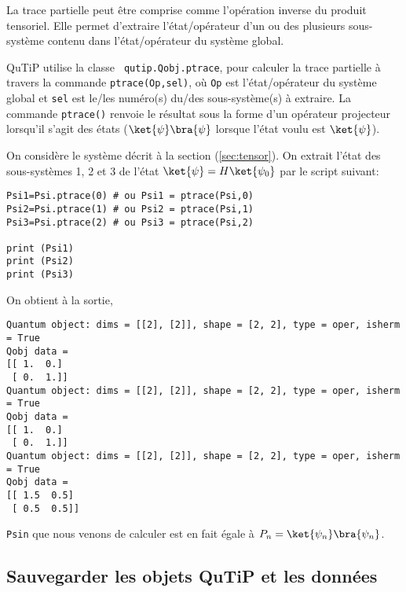 La trace partielle peut être comprise comme l'opération inverse du produit 
tensoriel. Elle permet d'extraire l'état/opérateur d'un ou des plusieurs 
sous-système contenu dans l'état/opérateur du système global.

QuTiP utilise la classe \texttt{ qutip.Qobj.ptrace}, pour calculer la trace 
partielle à travers la commande \texttt{ptrace(Op,sel)}, où \texttt{Op} est 
l'état/opérateur du système global et \texttt{sel} est le/les numéro(s) du/des 
sous-système(s) à extraire. La commande \texttt{ptrace()} renvoie le résultat 
sous la forme d'un opérateur projecteur lorsqu'il s'agit des états 
($\ket{\psi}\bra{\psi}$ lorsque l'état voulu est $\ket{\psi}$).

On considère le système décrit à la section (\ref{sec:tensor}). On extrait 
l'état des sous-systèmes 1, 2 et 3 de l'état $\ket{\psi}=H\ket{\psi_0}$ par le 
script suivant:\\
\begin{lstlisting}
Psi1=Psi.ptrace(0) # ou Psi1 = ptrace(Psi,0)
Psi2=Psi.ptrace(1) # ou Psi2 = ptrace(Psi,1)
Psi3=Psi.ptrace(2) # ou Psi3 = ptrace(Psi,2)

print (Psi1)
print (Psi2)
print (Psi3)
\end{lstlisting}
On obtient à la sortie,
\begin{lstlisting}
Quantum object: dims = [[2], [2]], shape = [2, 2], type = oper, isherm = True
Qobj data =
[[ 1.  0.]
 [ 0.  1.]]
Quantum object: dims = [[2], [2]], shape = [2, 2], type = oper, isherm = True
Qobj data =
[[ 1.  0.]
 [ 0.  1.]]
Quantum object: dims = [[2], [2]], shape = [2, 2], type = oper, isherm = True
Qobj data =
[[ 1.5  0.5]
 [ 0.5  0.5]]
\end{lstlisting}

\texttt{Psin} que nous venons de calculer est en fait égale à 
$P_n=\ket{\psi_n}\bra{\psi_n}$.

\subsection{Sauvegarder les objets QuTiP et les données}

